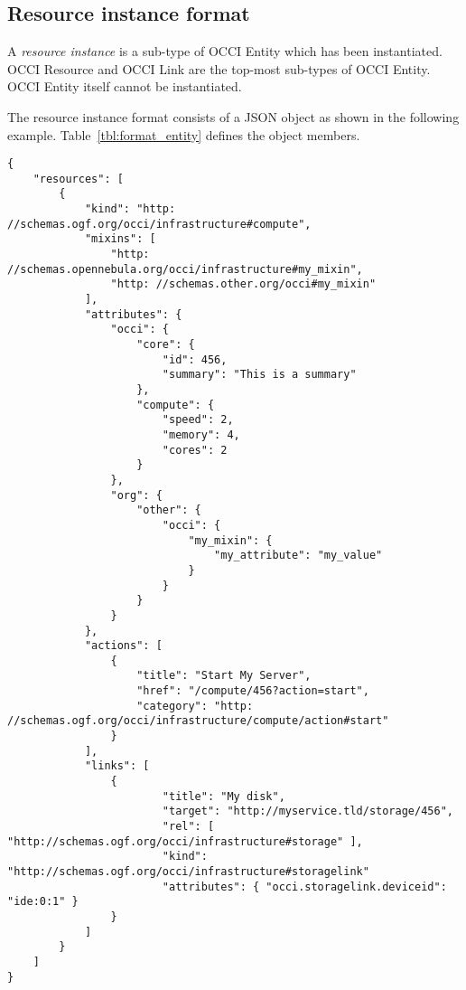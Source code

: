 \documentclass[10pt,a4paper]{article}
\begin{document}

\subsection{Resource instance format}
\label{sec:format_resource}

A {\em resource instance} is a sub-type of OCCI Entity which has been instantiated.
OCCI Resource and OCCI Link are the top-most sub-types of OCCI Entity.
OCCI Entity itself cannot be instantiated.

The resource instance format consists of a JSON object as shown in the
following example.
Table~\ref{tbl:format_entity} defines the object members.
\begin{verbatim}
{
    "resources": [
        {
            "kind": "http: //schemas.ogf.org/occi/infrastructure#compute",
            "mixins": [
                "http: //schemas.opennebula.org/occi/infrastructure#my_mixin",
                "http: //schemas.other.org/occi#my_mixin"
            ],
            "attributes": {
                "occi": {
                    "core": {
                        "id": 456,
                        "summary": "This is a summary"
                    },
                    "compute": {
                        "speed": 2,
                        "memory": 4,
                        "cores": 2
                    }
                },
                "org": {
                    "other": {
                        "occi": {
                            "my_mixin": {
                                "my_attribute": "my_value"
                            }
                        }
                    }
                }
            },
            "actions": [
                {
                    "title": "Start My Server",
                    "href": "/compute/456?action=start",
                    "category": "http: //schemas.ogf.org/occi/infrastructure/compute/action#start"
                }
            ],
            "links": [
                {
                		"title": "My disk",
                    	"target": "http://myservice.tld/storage/456",
                    	"rel": [ "http://schemas.ogf.org/occi/infrastructure#storage" ],
                		"kind": "http://schemas.ogf.org/occi/infrastructure#storagelink"
                		"attributes": { "occi.storagelink.deviceid": "ide:0:1" }
                }
            ]
        }
    ]
}
\end{verbatim}
\end{document}
